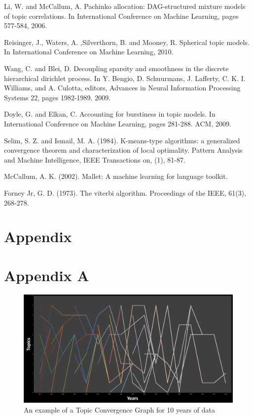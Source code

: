 \documentclass[conference]{IEEEtran}
\begin{document}
\begin{thebibliography}{1}
Li, W. and McCallum, A. Pachinko allocation: DAG-structured mixture models of topic correlations. In International Conference on Machine Learning, pages 577-584, 2006.

Reisinger, J., Waters, A. ,Silverthorn, B. and Mooney, R. Spherical topic models. In International Conference on Machine Learning, 2010.

Wang, C. and Blei, D. Decoupling sparsity and smoothness in the discrete hierarchical dirichlet process. In Y. Bengio, D. Schuurmans, J. Lafferty, C. K. I. Williams, and A. Culotta, editors, Advances in Neural Information Processing Systems 22, pages 1982-1989. 2009.

Doyle, G. and Elkan, C. Accounting for burstiness in topic models. In International Conference on Machine Learning, pages 281-288. ACM, 2009.

Selim, S. Z. and Ismail, M. A. (1984). K-means-type algorithms: a generalized convergence theorem and characterization of local optimality. Pattern Analysis and Machine Intelligence, IEEE Transactions on, (1), 81-87.


McCallum, A. K. (2002). Mallet: A machine learning for language toolkit.

Forney Jr, G. D. (1973). The viterbi algorithm. Proceedings of the IEEE, 61(3), 268-278.

\end{thebibliography}

\section{Appendix}
\section{Appendix A}
\begin{figure}[h]
	\center
	\includegraphics[width=1.3\textwidth, angle=270]{fig/tcg.png}
	\caption{An example of a Topic Convergence Graph for 10 years of data}
	\label{tcg}
\end{figure}




\end{document}
